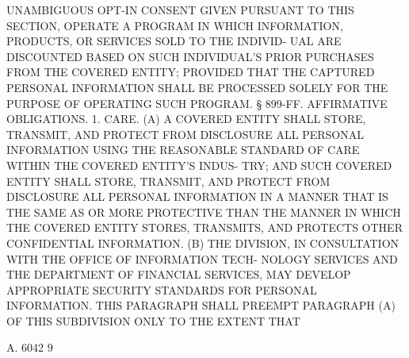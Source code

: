  UNAMBIGUOUS OPT-IN CONSENT GIVEN PURSUANT TO  THIS  SECTION,  OPERATE  A
 PROGRAM IN WHICH INFORMATION, PRODUCTS, OR SERVICES SOLD TO THE INDIVID-
 UAL  ARE  DISCOUNTED BASED ON SUCH INDIVIDUAL'S PRIOR PURCHASES FROM THE
 COVERED ENTITY; PROVIDED THAT THE CAPTURED PERSONAL INFORMATION SHALL BE
 PROCESSED SOLELY FOR THE PURPOSE OF OPERATING SUCH PROGRAM.
   § 899-FF. AFFIRMATIVE OBLIGATIONS. 1. CARE. (A) A COVERED ENTITY SHALL
 STORE, TRANSMIT, AND PROTECT FROM DISCLOSURE  ALL  PERSONAL  INFORMATION
 USING THE REASONABLE STANDARD OF CARE WITHIN THE COVERED ENTITY'S INDUS-
 TRY;  AND  SUCH  COVERED  ENTITY SHALL STORE, TRANSMIT, AND PROTECT FROM
 DISCLOSURE ALL PERSONAL INFORMATION IN A MANNER THAT IS THE SAME  AS  OR
 MORE  PROTECTIVE  THAN  THE  MANNER  IN WHICH THE COVERED ENTITY STORES,
 TRANSMITS, AND PROTECTS OTHER CONFIDENTIAL INFORMATION.
   (B) THE DIVISION, IN CONSULTATION WITH THE OFFICE OF INFORMATION TECH-
 NOLOGY SERVICES AND THE DEPARTMENT OF FINANCIAL  SERVICES,  MAY  DEVELOP
 APPROPRIATE  SECURITY STANDARDS FOR PERSONAL INFORMATION. THIS PARAGRAPH
 SHALL PREEMPT PARAGRAPH (A) OF THIS SUBDIVISION ONLY TO THE EXTENT  THAT

 A. 6042                             9
 
